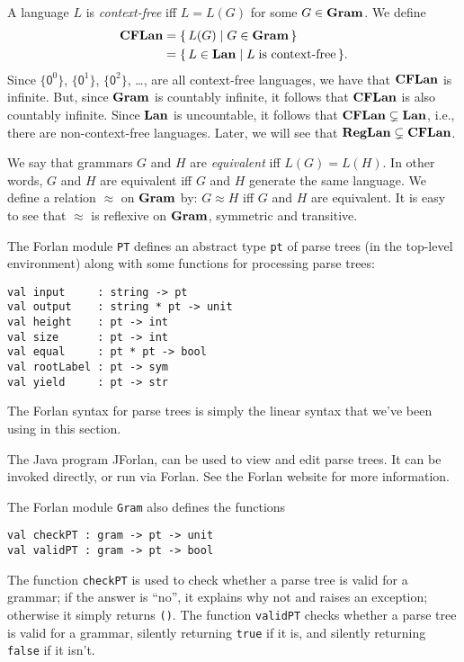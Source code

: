 A language $L$ is \emph{context-free} iff $L=L(G)$ for some
$G\in\mathbf{Gram}$.  We define
\begin{align*}
\mathbf{CFLan} &= \{ \, L(G) \mid G\in\mathbf{Gram} \, \} \\
&= \{ \, L\in\mathbf{Lan} \mid L\;\allowbreak\mbox{is context-free}\allowbreak \, \} .
\end{align*}
Since $\{\mathsf{0}^0\}$, $\{\mathsf{0}^1\}$, $\{\mathsf{0}^2\}$,
\ldots, are all context-free languages, we have that $\mathbf{CFLan}$ is
infinite.  But, since $\mathbf{Gram}$ is countably infinite, it follows that
$\mathbf{CFLan}$ is also countably infinite.
Since $\mathbf{Lan}$ is uncountable, it follows that
$\mathbf{CFLan}\subsetneq\mathbf{Lan}$, i.e., there are non-context-free
languages.  Later, we will see that $\mathbf{RegLan}\subsetneq\mathbf{CFLan}$.

We say that grammars $G$ and $H$ are
\emph{equivalent} iff $L(G) = L(H)$.  In other words, $G$
and $H$ are equivalent iff $G$ and $H$ generate the same
language.  We define a relation $\approx$ on $\mathbf{Gram}$ by:
$G\approx H$ iff $G$ and $H$ are equivalent.  It is easy to see
that $\approx$ is reflexive on $\mathbf{Gram}$, symmetric and transitive.

The Forlan module \texttt{PT} defines an abstract type \texttt{pt} of
parse trees (in the top-level environment) along with some functions
for processing parse trees:
\begin{verbatim}
val input     : string -> pt
val output    : string * pt -> unit
val height    : pt -> int
val size      : pt -> int
val equal     : pt * pt -> bool
val rootLabel : pt -> sym
val yield     : pt -> str
\end{verbatim}
The Forlan syntax for parse trees is simply the linear syntax that
we've been using in this section.

The Java program JForlan, can be used to view and edit parse
trees.  It can be invoked directly, or run via
Forlan.  See the Forlan website for more information.

The Forlan module \texttt{Gram} also defines the functions
\begin{verbatim}
val checkPT : gram -> pt -> unit
val validPT : gram -> pt -> bool
\end{verbatim}
The function \texttt{checkPT} is used to check whether a parse tree
is valid for a grammar; if the answer is ``no'', it explains why not
and raises an exception; otherwise it simply returns \texttt{()}.
The function \texttt{validPT} checks whether a parse tree is valid
for a grammar, silently returning \texttt{true} if it is, and silently
returning \texttt{false} if it isn't.

